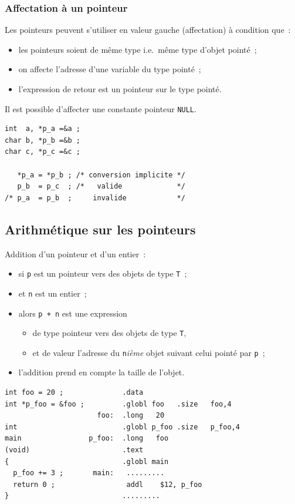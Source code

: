 \begin{frame}[fragile]
    \frametitle{Affectation \`a un pointeur}
    Les pointeurs peuvent s'utiliser en valeur gauche (affectation)
    \`a condition que~:
\begin{itemize}
\item les pointeurs soient de m\^eme type i.e.\ m\^eme type d'objet
  point\'e~;
  \item on affecte l'adresse d'une variable du type point\'e~;
  \item l'expression de retour est un pointeur sur le type point\'e.
  \end{itemize}
  Il est possible d'affecter une constante pointeur {\tt NULL}.
\begin{verbatim}
int  a, *p_a =&a ;
char b, *p_b =&b ;
char c, *p_c =&c ;

   *p_a = *p_b ; /* conversion implicite */
   p_b  = p_c  ; /*   valide             */
/* p_a  = p_b  ;     invalide            */
\end{verbatim}

\end{frame}
\begin{frame}[fragile]
    \section{Arithm\'etique sur les pointeurs}
    Addition d'un pointeur et d'un entier~: 
\begin{itemize}
  \item si {\tt p} est un pointeur vers des objets de type {\tt T}~;
  \item et {\tt n} est un  entier~;
  \item alors {\tt p + n} est une expression
    \begin{itemize}
    \item de type pointeur vers des objets de type {\tt T},
    \item et de valeur l'adresse du {\tt n}{\it i\`eme} objet suivant
      celui point\'e par {\tt p}~;
    \end{itemize}
  \item l'addition prend en compte la taille de l'objet.
\end{itemize}
\begin{verbatim}
int foo = 20 ;              .data                    
int *p_foo = &foo ;         .globl foo   .size   foo,4       
                      foo:  .long   20                  
int                         .globl p_foo .size   p_foo,4     
main                p_foo:  .long   foo     
(void)                      .text                    
{                           .globl main                      
  p_foo += 3 ;       main:   .........                
  return 0 ;                 addl    $12, p_foo       
}                           .........                
\end{verbatim}
\end{frame}
